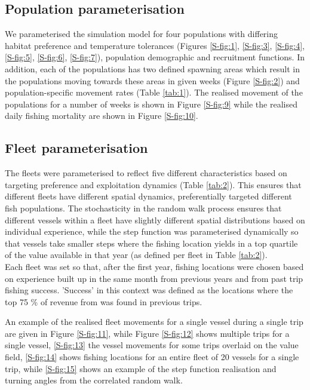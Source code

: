 \documentclass[review]{elsarticle}
\begin{document}
\subsection{Population parameterisation}

We parameterised the simulation model for four populations with differing
habitat preference and temperature tolerances (Figures \ref{S-fig:1},
\ref{S-fig:3}, \ref{S-fig:4}, \ref{S-fig:5}, \ref{S-fig:6}, \ref{S-fig:7}),
population demographic and recruitment functions. In addition, each of the
populations has two defined spawning areas which result in the populations
moving towards these areas in given weeks (Figure \ref{S-fig:2}) and
population-specific movement rates (Table \ref{tab:1}). The realised movement
of the populations for a number of weeks is shown in Figure \ref{S-fig:9} while
the realised daily fishing mortality are shown in Figure \ref{S-fig:10}. \\

\subsection{Fleet parameterisation}

The fleets were parameterised to reflect five different characteristics based
on targeting preference and exploitation dynamics (Table \ref{tab:2}). This
ensures that different fleets have different spatial dynamics, preferentially
targeted different fish populations. The stochasticity in the random walk
process ensures that different vessels within a fleet have slightly different
spatial distributions based on individual experience, while the step function
was parameterised dynamically so that vessels take smaller steps where the
fishing location yields in a top quartile of the value available in that year
(as defined per fleet in Table \ref{tab:2}). \\

Each fleet was set so that, after the first year, fishing locations were chosen
based on experience built up in the same month from previous years and from
past trip fishing success. 'Success' in this context was defined as the
locations where the top 75 \% of revenue from was found in previous trips.

An example of the realised fleet movements for a single vessel during a single
trip are given in Figure \ref{S-fig:11}, while Figure \ref{S-fig:12} shows
multiple trips for a single vessel, \ref{S-fig:13} the vessel movements for
some trips overlaid on the value field, \ref{S-fig:14} shows fishing locations
for an entire fleet of 20 vessels for a single trip, while \ref{S-fig:15} shows
an example of the step function realisation and turning angles from the
correlated random walk.
\end{document}
